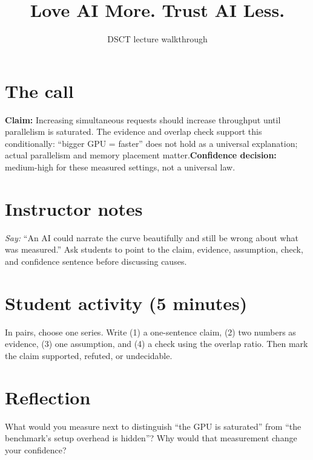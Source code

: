 \documentclass{article}\usepackage[margin=1in]{geometry}\usepackage{booktabs}\usepackage{graphicx}\usepackage{xcolor}\usepackage{hyperref}
\title{Love AI More. Trust AI Less.}\author{DSCT lecture walkthrough}\date{}
\begin{document}
\maketitle
\section{The call}\textbf{Claim:} Increasing simultaneous requests should increase throughput until parallelism is saturated. The evidence and overlap check support this conditionally: “bigger GPU = faster” does not hold as a universal explanation; actual parallelism and memory placement matter.\textbf{Confidence decision:} medium-high for these measured settings, not a universal law.
\section{Instructor notes}\textit{Say:} “An AI could narrate the curve beautifully and still be wrong about what was measured.” Ask students to point to the claim, evidence, assumption, check, and confidence sentence before discussing causes.
\section{Student activity (5 minutes)}In pairs, choose one series. Write (1) a one-sentence claim, (2) two numbers as evidence, (3) one assumption, and (4) a check using the overlap ratio. Then mark the claim supported, refuted, or undecidable.
\section{Reflection}What would you measure next to distinguish “the GPU is saturated” from “the benchmark's setup overhead is hidden”? Why would that measurement change your confidence?
\end{document}
